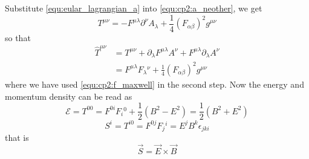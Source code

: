 \begin{enumerate}[label = {(\alph*)}]
\begin{equation}
    \end{equation}
    Substitute \eqref{equ:eular_lagrangian_a} into \eqref{equ:cp2:a_neother}, we get
    \begin{equation}
        T^{\mu\nu} = -F^{\mu\lambda} \partial^\nu A_\lambda + \frac{1}{4} (F_{\alpha\beta})^2 g^{\mu\nu}
    \end{equation}
    so that
    \begin{align*}
        \widehat{T}^{\mu\nu} 
        & = T^{\mu\nu} + \partial_\lambda F^{\mu\lambda} A^\nu + F^{\mu\lambda} \partial_\lambda A^\nu \\
        & = F^{\mu\lambda} F_\lambda{}^\nu + \frac{1}{4}(F_{\alpha\beta})^2 g^{\mu\nu}
    \end{align*}
    where we have used \eqref{equ:cp2:f_maxwell} in the second step. Now the energy and momentum density 
    can be read as
    \begin{equation*}
        \mathcal{E} = T^{00} = F^{0i}F_i{}^0 + \frac{1}{2}(B^2 - E^2) = \frac{1}{2} (B^2 + E^2)
    \end{equation*}
    \begin{equation*}
        S^i = T^{i0} = F^{0j}F_j{}^i = E^j B^k \epsilon_{jki}
    \end{equation*}
    that is
    \begin{equation*}
        \vec{S} = \vec{E} \times \vec{B}
    \end{equation*}
\end{enumerate}

